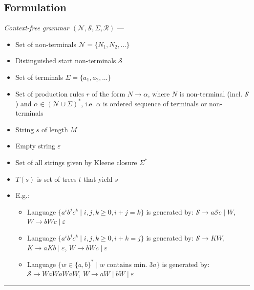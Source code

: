 \subsection*{Formulation}
\emph{Context-free grammar $(\mathcal{N}, \mathcal{S}, \Sigma, \mathcal{R})$} ---
\begin{itemize}
    \item Set of non-terminals $\mathcal{N} = \{N_1, N_2, \dots\}$
    \item Distinguished start non-terminals $\mathcal{S}$
    \item Set of terminals $\Sigma = \{a_1, a_2, \dots\}$
    \item Set of production rules $r$ of the form $N \to \alpha$, where $N$ is non-terminal (incl. $\mathcal{S}$) and $\alpha \in (\mathcal{N} \cup \Sigma)^*$, i.e. $\alpha$ is ordered sequence of terminals or non-terminals
    \item String $s$ of length $M$ 
    \item Empty string $\varepsilon$
    \item Set of all strings given by Kleene closure $\Sigma^*$
    \item $T(s)$ is set of trees $t$ that yield $s$
    \item E.g.:
    \begin{itemize}
        \item Language $\{a^i b^j c^k \mid i, j, k \geq 0, i + j = k\}$ is generated by:
        $
        \mathcal{S} \to a \mathcal{S} c \mid W$,
        $W \to bWc \mid \varepsilon
        $
        \item Language $\{a^i b^j c^k \mid i, j, k \geq 0, i + k = j\}$ is generated by:
        $
        \mathcal{S} \to KW$,
        $K \to aKb \mid \varepsilon$,
        $W \to bWc \mid \varepsilon$
        \item Language $\{w \in \{a, b\}^* \mid w \textrm{ contains min. }3 a\}$ is generated by:
        $
        \mathcal{S} \to WaW aW aW$,
        $W \to aW \mid bW \mid \varepsilon
        $
    \end{itemize}
\end{itemize}

{\color{lightgray}\hrule height 0.001mm}

